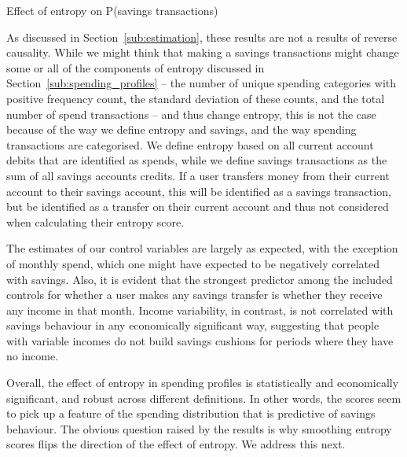 \begin{landscape}
    \begin{table}[ht]
        \centering\scriptsize
        \caption{Effect of entropy on P(savings transactions)}
        \label{tab:main}
        
    \end{table}
\end{landscape}

As discussed in Section~\ref{sub:estimation}, these results are not a results
of reverse causality. While we might think that making a savings transactions
might change some or all of the components of entropy discussed in
Section~\ref{sub:spending_profiles} -- the number of unique spending categories
with positive frequency count, the standard deviation of these counts, and the
total number of spend transactions -- and thus change entropy, this is not the
case because of the way we define entropy and savings, and the way spending
transactions are categorised. We define entropy based on all current account
debits that are identified as spends, while we define savings transactions as
the sum of all savings accounts credits. If a user transfers money from their
current account to their savings account, this will be identified as a savings
transaction, but be identified as a transfer on their current account and thus
not considered when calculating their entropy score.

The estimates of our control variables are largely as expected, with the
exception of monthly spend, which one might have expected to be negatively
correlated with savings. Also, it is evident that the strongest predictor among
the included controls for whether a user makes any savings transfer is whether
they receive any income in that month. Income variability, in contrast, is not
correlated with savings behaviour in any economically significant way,
suggesting that people with variable incomes do not build savings cushions for
periods where they have no income.

Overall, the effect of entropy in spending profiles is statistically and
economically significant, and robust across different definitions. In other
words, the scores seem to pick up a feature of the spending distribution that
is predictive of savings behaviour. The obvious question raised by the results
is why smoothing entropy scores flips the direction of the effect of entropy.
We address this next.


